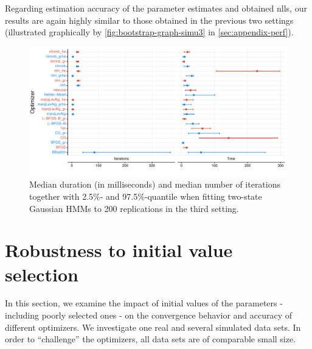 \documentclass[]{interact}\usepackage[]{graphicx}\usepackage[dvipsnames]{xcolor}
\makeatletter
\def\maxwidth{ %
  \ifdim\Gin@nat@width>\linewidth
    \linewidth
  \else
    \Gin@nat@width
  \fi
}
\newenvironment{knitrout}{}{} %
\theoremstyle{plain}%
\theoremstyle{definition}
\theoremstyle{remark}
\makeatother
\begin{document}
Regarding estimation accuracy of the parameter estimates and obtained nlls, our results are again highly similar to those obtained in the previous two settings (illustrated graphically by \autoref{fig:bootstrap-graph-simu3} in \autoref{sec:appendix-perf}). 
  
\begin{knitrout}
\color{fgcolor}\begin{figure}[htb]

{\centering \includegraphics[width=\maxwidth]{figure/optimizers-acceleration-simu3-plot-1} 

}

\caption[Median duration (in milliseconds) and median number of iterations together with 2.5\%- and 97.5\%-quantile when fitting two-state Gaussian HMMs to 200 replications in the third setting]{Median duration (in milliseconds) and median number of iterations together with 2.5\%- and 97.5\%-quantile when fitting two-state Gaussian HMMs to 200 replications in the third setting.}\label{fig:optimizers-acceleration-simu3-plot}
\end{figure}

\end{knitrout}




\section{Robustness to initial value selection}
\label{sec:robustness}

In this section, we examine the impact of initial values of the parameters - including poorly selected ones - on the convergence behavior and accuracy of different optimizers. We investigate one real and several simulated data sets. In order to ``challenge'' the optimizers, all data sets are of comparable small size.
\end{document}
